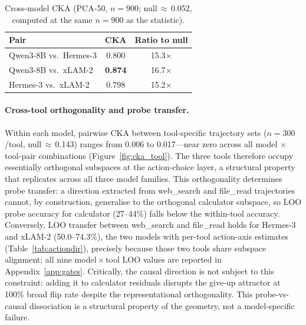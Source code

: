 \documentclass{article}
\begin{document}
\begin{table}[h]
\caption{Cross-model CKA (PCA-50, $n{=}900$; null\,$\approx$\,0.052,
computed at the same $n{=}900$ as the statistic).}
\label{tab:cka_model}
\centering\small
\begin{tabular}{lcc}
\toprule
Pair & CKA & Ratio to null \\
\midrule
Qwen3-8B vs.\ Hermes-3 & 0.800 & 15.3$\times$ \\
Qwen3-8B vs.\ xLAM-2   & \textbf{0.874} & 16.7$\times$ \\
Hermes-3 vs.\ xLAM-2   & 0.798 & 15.2$\times$ \\
\bottomrule
\end{tabular}
\end{table}

\paragraph{Cross-tool orthogonality and probe transfer.}
Within each model, pairwise CKA between tool-specific trajectory sets
($n{=}300$/tool, null\,$\approx$\,0.143) ranges from 0.006 to
0.017---near zero across all model $\times$ tool-pair combinations
(Figure~\ref{fig:cka_tool}).
The three tools therefore occupy essentially orthogonal subspaces at
the action-choice layer, a structural property that replicates across
all three model families.
This orthogonality determines probe transfer: a direction extracted
from web\_search and file\_read trajectories cannot, by construction,
generalise to the orthogonal calculator subspace, so LOO probe accuracy
for calculator (27--44\%) falls below the within-tool accuracy.
Conversely, LOO transfer between web\_search and file\_read holds for
Hermes-3 and xLAM-2 (50.0--74.3\%), the two models with per-tool
action-axis estimates (Table~\ref{tab:actiondir}), precisely because
those two tools share subspace alignment; all nine model\,$\times$\,tool
LOO values are reported in Appendix~\ref{app:gates}.
Critically, the causal direction is not subject to this constraint:
adding it to calculator residuals disrupts the give-up attractor at
100\% broad flip rate despite the representational orthogonality.
This probe-vs-causal dissociation is a structural property of the
geometry, not a model-specific failure.
\end{document}
